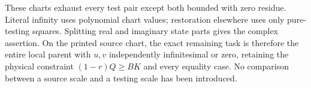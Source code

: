 These charts exhaust every test pair except both bounded with zero
residue. Literal infinity uses polynomial chart values; restoration
elsewhere uses only pure-testing squares. Splitting real and imaginary
state parts gives the complex assertion. On the printed source chart,
the exact remaining task is therefore the entire local parent with
$u,v$ independently infinitesimal or zero, retaining the physical
constraint $(1-r)Q\ge BK$ and every equality case. No comparison
between a source scale and a testing scale has been introduced.
